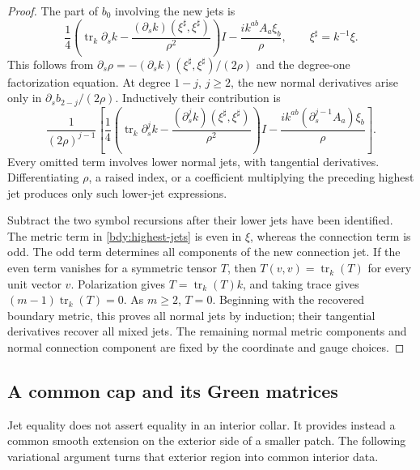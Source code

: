 \begin{proof}
The part of \(b_0\) involving the new jets is
\begin{equation}\label{bdy:first-jets}
 \frac14\left(\operatorname{tr}_k\partial_s k
       -\frac{(\partial_s k)(\xi^\sharp,\xi^\sharp)}{\rho^2}\right)I
       -\frac{ik^{ab}A_a\xi_b}{\rho},
 \qquad \xi^\sharp=k^{-1}\xi.
\end{equation}
This follows from
\(\partial_s\rho=-(\partial_s k)(\xi^\sharp,\xi^\sharp)/(2\rho)\)
and the degree-one factorization equation.  At degree \(1-j\),
\(j\ge2\), the new normal derivatives arise only in
\(\partial_s b_{2-j}/(2\rho)\).  Inductively their contribution is
\begin{equation}\label{bdy:highest-jets}
 \frac{1}{(2\rho)^{j-1}}
 \left[
 \frac14\left(\operatorname{tr}_k\partial_s^j k
       -\frac{(\partial_s^j k)(\xi^\sharp,\xi^\sharp)}{\rho^2}\right)I
       -\frac{ik^{ab}(\partial_s^{j-1}A_a)\xi_b}{\rho}
 \right].
\end{equation}
Every omitted term involves lower normal jets, with tangential
derivatives.  Differentiating \(\rho\), a raised index, or a
coefficient multiplying the preceding highest jet produces only
such lower-jet expressions.

Subtract the two symbol recursions after their lower jets have
been identified.  The metric term in
\eqref{bdy:highest-jets} is even in \(\xi\), whereas the connection
term is odd.  The odd term determines all components of the new
connection jet.  If the even term vanishes for a symmetric tensor
\(T\), then \(T(v,v)=\operatorname{tr}_k(T)\) for every unit vector
\(v\).  Polarization gives \(T=\operatorname{tr}_k(T)k\), and taking
trace gives \((m-1)\operatorname{tr}_k(T)=0\).  As \(m\ge2\),
\(T=0\).  Beginning with the recovered boundary metric, this proves
all normal jets by induction; their tangential derivatives recover
all mixed jets.  The remaining normal metric components and normal
connection component are fixed by the coordinate and gauge choices.
\end{proof}

\subsection{A common cap and its Green matrices}

Jet equality does not assert equality in an interior collar.  It
provides instead a common smooth extension on the exterior side of a
smaller patch.  The following variational argument turns that exterior
region into common interior data.

